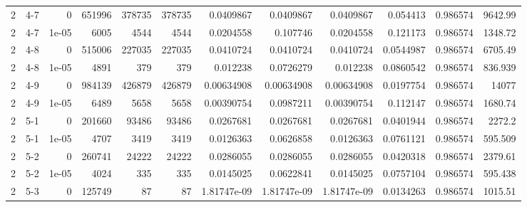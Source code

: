 \begin{tabular}{rlrrrrrrrrrr}
     2 & 4-7    &      0     &      651996 &            378735 &            378735 &     0.0409867   &     0.0409867   &      0.0409867   &        0.054413  &               0.986574 &         9642.99    \\
     2 & 4-7    &      1e-05 &        6005 &              4544 &              4544 &     0.0204558   &     0.107746    &      0.0204558   &        0.121173  &               0.986574 &         1348.72    \\
     2 & 4-8    &      0     &      515006 &            227035 &            227035 &     0.0410724   &     0.0410724   &      0.0410724   &        0.0544987 &               0.986574 &         6705.49    \\
     2 & 4-8    &      1e-05 &        4891 &               379 &               379 &     0.012238    &     0.0726279   &      0.012238    &        0.0860542 &               0.986574 &          836.939   \\
     2 & 4-9    &      0     &      984139 &            426879 &            426879 &     0.00634908  &     0.00634908  &      0.00634908  &        0.0197754 &               0.986574 &        14077       \\
     2 & 4-9    &      1e-05 &        6489 &              5658 &              5658 &     0.00390754  &     0.0987211   &      0.00390754  &        0.112147  &               0.986574 &         1680.74    \\
     2 & 5-1    &      0     &      201660 &             93486 &             93486 &     0.0267681   &     0.0267681   &      0.0267681   &        0.0401944 &               0.986574 &         2272.2     \\
     2 & 5-1    &      1e-05 &        4707 &              3419 &              3419 &     0.0126363   &     0.0626858   &      0.0126363   &        0.0761121 &               0.986574 &          595.509   \\
     2 & 5-2    &      0     &      260741 &             24222 &             24222 &     0.0286055   &     0.0286055   &      0.0286055   &        0.0420318 &               0.986574 &         2379.61    \\
     2 & 5-2    &      1e-05 &        4024 &               335 &               335 &     0.0145025   &     0.0622841   &      0.0145025   &        0.0757104 &               0.986574 &          595.438   \\
     2 & 5-3    &      0     &      125749 &                87 &                87 &     1.81747e-09 &     1.81747e-09 &      1.81747e-09 &        0.0134263 &               0.986574 &         1015.51    \\

\end{tabular}
